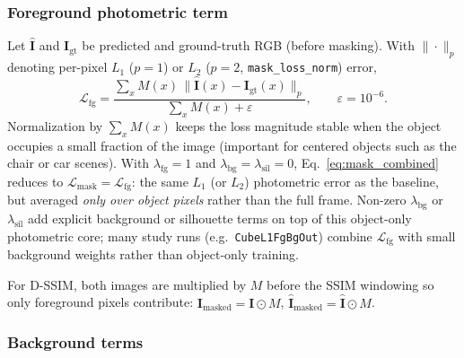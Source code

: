 \subsubsection{Foreground photometric term}
\label{subsubsec:mask_fg}

Let $\hat{\mathbf{I}}$ and $\mathbf{I}_{\mathrm{gt}}$ be predicted and ground-truth RGB (before masking). With $\|\cdot\|_{p}$ denoting per-pixel $L_1$ ($p=1$) or $L_2$ ($p=2$, \texttt{mask\_loss\_norm}) error,
\begin{equation}
\mathcal{L}_{\mathrm{fg}}
=\frac{\sum_{x} M(x)\,\bigl\|\hat{\mathbf{I}}(x)-\mathbf{I}_{\mathrm{gt}}(x)\bigr\|_{p}}
{\sum_{x} M(x) + \varepsilon},
\qquad \varepsilon=10^{-6}.
\label{eq:mask_fg}
\end{equation}
Normalization by $\sum_x M(x)$ keeps the loss magnitude stable when the object occupies a small fraction of the image (important for centered objects such as the chair or car scenes). With $\lambda_{\mathrm{fg}}=1$ and $\lambda_{\mathrm{bg}}=\lambda_{\mathrm{sil}}=0$, Eq.~\eqref{eq:mask_combined} reduces to $\mathcal{L}_{\mathrm{mask}}=\mathcal{L}_{\mathrm{fg}}$: the same $L_1$ (or $L_2$) photometric error as the baseline, but averaged \emph{only over object pixels} rather than the full frame. Non-zero $\lambda_{\mathrm{bg}}$ or $\lambda_{\mathrm{sil}}$ add explicit background or silhouette terms on top of this object-only photometric core; many study runs (e.g.\ \texttt{CubeL1FgBgOut}) combine $\mathcal{L}_{\mathrm{fg}}$ with small background weights rather than object-only training.

For D-SSIM, both images are multiplied by $M$ before the SSIM windowing so only foreground pixels contribute:
$\mathbf{I}_{\mathrm{masked}}=\mathbf{I}\odot M$, $\hat{\mathbf{I}}_{\mathrm{masked}}=\hat{\mathbf{I}}\odot M$.

\subsubsection{Background terms}
\label{subsubsec:mask_bg}

